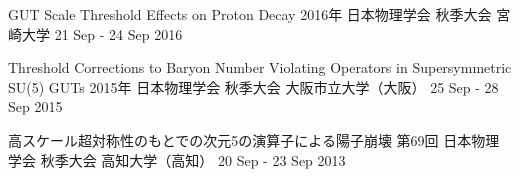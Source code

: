 \begin{talklist}

\talkentry
  {GUT Scale Threshold Effects on Proton Decay}
  {2016年 日本物理学会 秋季大会}
  {宮崎大学}
  {21 Sep - 24 Sep 2016}
  {}

\talkentry
  {Threshold Corrections to Baryon Number Violating Operators in Supersymmetric SU(5) GUTs}
  {2015年 日本物理学会 秋季大会}
  {大阪市立大学（大阪）}
  {25 Sep - 28 Sep 2015}
  {}

\talkentry
  {高スケール超対称性のもとでの次元5の演算子による陽子崩壊}
  {第69回 日本物理学会 秋季大会}
  {高知大学（高知）}
  {20 Sep - 23 Sep 2013}
  {}

\end{talklist}
